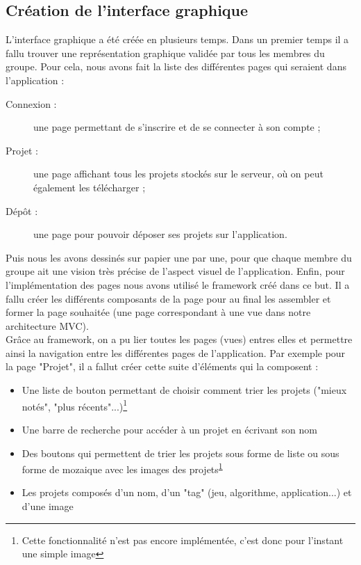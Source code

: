 \documentclass{report}
\begin{document}
\subsection{Création de l'interface graphique}
L'interface graphique a été créée en plusieurs temps. Dans un premier temps il a fallu trouver une représentation graphique validée par tous les membres du groupe. Pour cela, nous avons fait la liste des différentes pages qui seraient dans l'application :
\begin{description}
    \item[Connexion :] une page permettant de s'inscrire et de se connecter à son compte ;
    \item[Projet :] une page affichant tous les projets stockés sur le serveur, où on peut également les télécharger ;
    \item[Dépôt :] une page pour pouvoir déposer ses projets sur l'application.
\end{description}
Puis nous les avons dessinés sur papier une par une, pour que chaque membre du groupe ait une vision très précise de l'aspect visuel de l'application.
Enfin, pour l'implémentation des pages nous avons utilisé le framework créé dans ce but. Il a fallu créer les différents composants de la page pour au final les assembler et former la page souhaitée (une page correspondant à une vue dans notre architecture MVC). \\
Grâce au framework, on a pu lier toutes les pages (vues) entres elles et permettre ainsi la navigation entre les différentes pages de l'application.
Par exemple pour la page "Projet", il a fallut créer cette suite d'éléments qui la composent :
\begin{itemize}[label=$-$]
    \item Une liste de bouton permettant de choisir comment trier les projets ("mieux notés", "plus récents"...)\footnote{\label{note}Cette fonctionnalité n'est pas encore implémentée, c'est donc pour l'instant une simple image}
    \item Une barre de recherche pour accéder à un projet en écrivant son nom
    \item Des boutons qui permettent de trier les projets sous forme de liste ou sous forme de mozaique avec les images des projets\textsuperscript{\ref{note}}
    \item Les projets composés d'un nom, d'un "tag" (jeu, algorithme, application...) et d'une image
\end{itemize}
\end{document}
